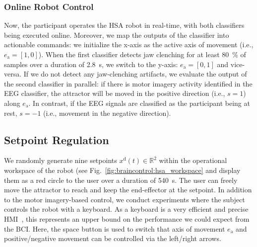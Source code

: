 \subsubsection{Online Robot Control}
Now, the participant operates the HSA robot in real-time, with both classifiers being executed online.
Moreover, we map the outputs of the classifier into actionable commands: we initialize the x-axis as the active axis of movement (i.e., $e_\mathrm{a} = [1,0]$). When the first classifier detects jaw clenching for at least \SI{80}{\percent} of samples over a duration of \SI{2.8}{s}, we switch to the y-axis: $e_\mathrm{a} = [0,1]$ and vice-versa. If we do not detect any jaw-clenching artifacts, we evaluate the output of the second classifier in parallel: if there is motor imagery activity identified in the \gls{EEG} classifier, the attractor will be moved in the positive direction (i.e., $s=1$) along $e_\mathrm{a}$. In contrast, if the \gls{EEG} signals are classified as the participant being at rest, $s=-1$ (i.e., movement in the negative direction).


\subsection{Setpoint Regulation}\label{sub:braincontrol:experiments:setpoint_regulation}
We randomly generate nine setpoints $x^\mathrm{d}(t) \in \mathbb{R}^2$ within the operational workspace of the robot (see Fig.~\ref{fig:braincontrol:hsa_workspace} and display them as a red circle to the user over a duration of \SI{540}{s}.
The user can freely move the attractor to reach and keep the end-effector at the setpoint.
In addition to the motor imagery-based control, we conduct experiments where the subject controls the robot with a keyboard.
As a keyboard is a very efficient and precise \gls{HMI}~\citep{vasiljevic2016case, mahmud2020interface}, this represents an upper bound on the performance we could expect from the \gls{BCI}.
Here, the space button is used to switch that axis of movement $e_\mathrm{a}$ and positive/negative movement can be controlled via the left/right arrows.

